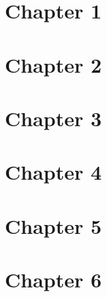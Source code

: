 \documentclass{article}
\theoremstyle{definition}
\begin{document}

\section{Chapter 1}





\section{Chapter 2}





\section{Chapter 3}

\newpage

\newpage

\newpage
\section{Chapter 4}




\section{Chapter 5}



\section{Chapter 6}







\end{document}
